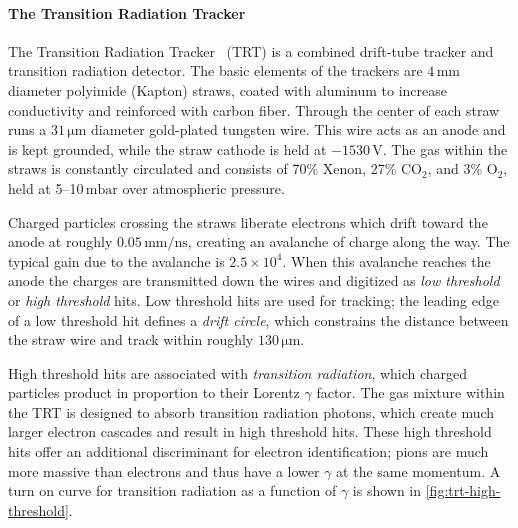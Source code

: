 \paragraph{The Transition Radiation Tracker}
The Transition Radiation Tracker~\cite{atlas-trt,atlas-trt2} (TRT) is a combined drift-tube tracker and transition radiation detector.
The basic elements of the trackers are $4\,\mathrm{mm}$ diameter polyimide (Kapton) straws, coated with aluminum to increase conductivity and reinforced with carbon fiber.
Through the center of each straw runs a $31\,\mathrm{\mu m}$ diameter gold-plated tungsten wire.
This wire acts as an anode and is kept grounded, while the straw cathode is held at $-1530\,\mathrm{V}$.
The gas within the straws is constantly circulated and consists of 70\% Xenon, 27\% CO$_2$, and 3\% O$_2$, held at 5--10$\,\mathrm{mbar}$ over atmospheric pressure.

Charged particles crossing the straws liberate electrons which drift toward the anode at roughly $0.05\,\mathrm{mm/ns}$, creating an avalanche of charge along the way.
The typical gain due to the avalanche is $2.5 \times 10^4$.
When this avalanche reaches the anode the charges are transmitted down the wires and digitized as \emph{low threshold} or \emph{high threshold} hits.
Low threshold hits are used for tracking; the leading edge of a low threshold hit defines a \emph{drift circle}, which constrains the distance between the straw wire and track within roughly $130\,\mathrm{\mu m}$.

\begin{cfig}
  \caption[TRT high threshold probability for $e$, $\mu$, and pions]{
    Probability of a high-threshold hit in the TRT barrel section as a function of the $\gamma$ for $e$ (open squares), $\mu$ (full triangles) and pions (open circles) in the energy range 2--350$\,\gev$, as measured in the combined test-beam.}
  \label{fig:trt-high-threshold}
\end{cfig}

High threshold hits are associated with \emph{transition radiation}, which charged particles product in proportion to their Lorentz $\gamma$ factor.
The gas mixture within the TRT is designed to absorb transition radiation photons, which create much larger electron cascades and result in high threshold hits.
These high threshold hits offer an additional discriminant for electron identification; pions are much more massive than electrons and thus have a lower $\gamma$ at the same momentum. A turn on curve for transition radiation as a function of $\gamma$ is shown in \cref{fig:trt-high-threshold}.

